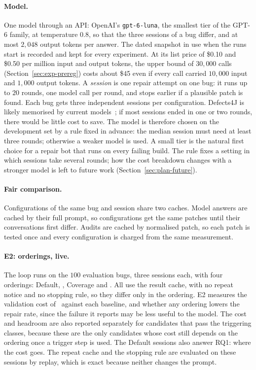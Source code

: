 \paragraph{Model.} One model through an API: OpenAI's \texttt{gpt-6-luna}, the
smallest tier of the GPT-6 family, at temperature $0.8$, so that the three
sessions of a bug differ, and at most $2{,}048$ output tokens per answer. The
dated snapshot in use when the runs start is recorded and kept for every
experiment. At its list price of \$0.10 and \$0.50 per million input and output
tokens, the upper bound of $30{,}000$ calls (Section~\ref{sec:exp-prereg}) costs
about \$45 even if every call carried $10{,}000$ input and $1{,}000$ output
tokens. A \emph{session} is one repair
attempt on one bug: it runs up to $20$ rounds, one model call per round, and
stops earlier if a plausible patch is found. Each bug gets three independent
sessions per configuration.
Defects4J is likely memorised by current models~\citep{ramos2024memorizing}; if
most sessions ended in one or two rounds, there would be little cost to save.
The model is therefore chosen on the development set by a rule fixed in
advance: the median session must need at least three rounds; otherwise a
weaker model is used. A small tier is the natural first choice for a repair
bot that runs on every failing build. The rule fixes a setting in which
sessions take several rounds; how the cost breakdown changes with a stronger
model is left to future work (Section~\ref{sec:plan-future}).

\paragraph{Fair comparison.} Configurations of the same bug and session share two
caches. Model answers are cached by their full prompt, so configurations get
the same patches until their conversations first differ. Audits are cached by
normalised patch, so each patch is tested once and every configuration is
charged from the same measurement.

\paragraph{E2: orderings, live.} The loop runs on the $100$ evaluation bugs, three sessions each, with four
orderings: Default, \frtp, Coverage and \km. All
use the result cache, with no repeat notice and no stopping rule, so they differ
only in the ordering. E2 measures the validation cost of \km\ against each
baseline, and whether any ordering lowers the repair rate, since the failure it reports
may be less useful to the model. The cost and headroom are also reported
separately for candidates that pass the triggering classes, because these are
the only candidates whose cost still depends on the ordering once a trigger
step is used. The Default sessions also answer RQ1: where the cost goes. The repeat cache and
the stopping rule are evaluated on these sessions by replay, which is exact because neither changes the prompt.


